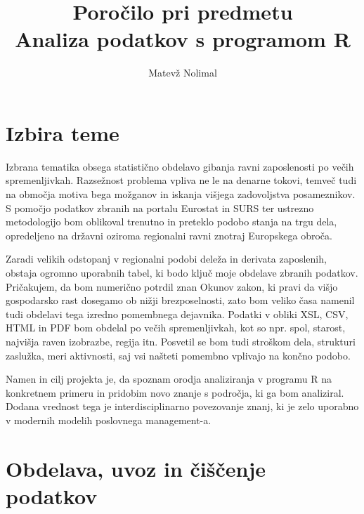 \documentclass[11pt,a4paper]{article}
\begin{document}
\title{Poročilo pri predmetu \\
Analiza podatkov s programom R}
\author{Matevž Nolimal}

\section{Izbira teme}

Izbrana tematika obsega statistično obdelavo gibanja ravni zaposlenosti po večih spremenljivkah. Razsežnost problema vpliva ne le na denarne tokovi, temveč tudi na območja motiva bega možganov in iskanja višjega zadovoljstva posameznikov. S pomočjo podatkov zbranih na portalu Eurostat in SURS ter ustrezno metodologijo bom oblikoval trenutno in preteklo podobo stanja na trgu dela, opredeljeno na državni oziroma regionalni ravni znotraj Europskega obroča.

Zaradi velikih odstopanj v regionalni podobi deleža in derivata zaposlenih, obstaja ogromno uporabnih tabel, ki bodo ključ moje obdelave zbranih podatkov. Pričakujem, da bom numerično potrdil znan Okunov zakon, ki pravi da višjo gospodarsko rast dosegamo ob nižji brezposelnosti, zato bom veliko časa namenil tudi obdelavi tega izredno pomembnega dejavnika. Podatki v obliki XSL, CSV, HTML in PDF bom obdelal po večih spremenljivkah, kot so npr. spol, starost, najvišja raven izobrazbe, regija itn. Posvetil se bom tudi stroškom dela, strukturi zaslužka, meri aktivnosti, saj vsi našteti pomembno vplivajo na končno podobo. 

Namen in cilj projekta je, da spoznam orodja analiziranja v programu R na konkretnem primeru in pridobim novo znanje s področja, ki ga bom analiziral. Dodana vrednost tega je interdisciplinarno povezovanje znanj, ki je zelo uporabno v modernih modelih poslovnega management-a.
\pagebreak
\section{Obdelava, uvoz in čiščenje podatkov}
\end{document}
